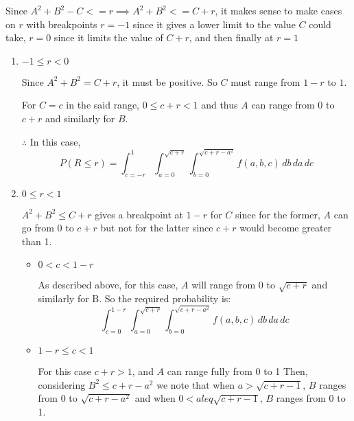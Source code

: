 \documentclass[12pt, oneside]{article}
\begin{document}
\begin{enumerate}
{    Since \(A^2 + B^2 - C <= r \implies A^2 + B^2 <= C + r\), it makes sense to make
    cases on \(r\) with breakpoints \(r = -1\) since it gives a lower limit to the value
    \(C\) could take, \(r = 0\) since it limits the value of \(C + r\), and then finally
    at \(r = 1\)

    \begin{enumerate}
        \item {
            \(-1 \leq r < 0\)

            Since \(A^2 + B^2 = C + r\), it must be positive. So \(C\) must range from
            \(1 - r\) to \(1\). 

            For \(C = c\) in the said range, \(0 \leq c + r < 1\) and thus \(A\) can
            range from 0 to \(c + r\) and similarly for \(B\).

            \(\therefore\) In this case,
            \[
                P(R \leq r) = \int_{c = -r}^{1} \int_{a=0}^{\sqrt{c + r}} 
                              \int_{b = 0}^{\sqrt{c + r - a^2}} f(a, b, c)\, db\, da\, dc
            \]
        }

        \item {
            \(0 \leq r < 1\)

            \(A^2 + B^2 \leq C + r\) gives a breakpoint at \(1 - r\) for \(C\) since
            for the former, \(A\) can go from \(0 \text{ to } c + r\) but not for the
            latter since \(c + r\) would become greater than 1.

            \begin{itemize}
                \item {
                    \(0 < c < 1 - r\)

                    As described above, for this case, \(A\) will range from 0 to 
                    \(\sqrt{c + r}\) and similarly for B.
                    So the required probability is:
                    \[
                        \int_{c = 0}^{1 - r} \int_{a=0}^{\sqrt{c + r}} 
                        \int_{b = 0}^{\sqrt{c + r - a^2}} f(a, b, c)\, db\, da\, dc
                    \]
                }

                \item {
                    \(1 - r \leq c < 1\)

                    For this case \(c + r > 1\), and \(A\) can range fully from 0 to 1
                    Then, considering \(B^2 \leq c + r - a^2\) we note that when 
                    \(a > \sqrt{c + r - 1}\), \(B\) ranges from 0 to \(\sqrt{c + r - a^2}\)
                    and when \(0 < a leq \sqrt{c + r - 1}\), \(B\) ranges from 0 to 1.

}
\end{itemize}}
\end{enumerate}}
\end{enumerate}
\end{document}
